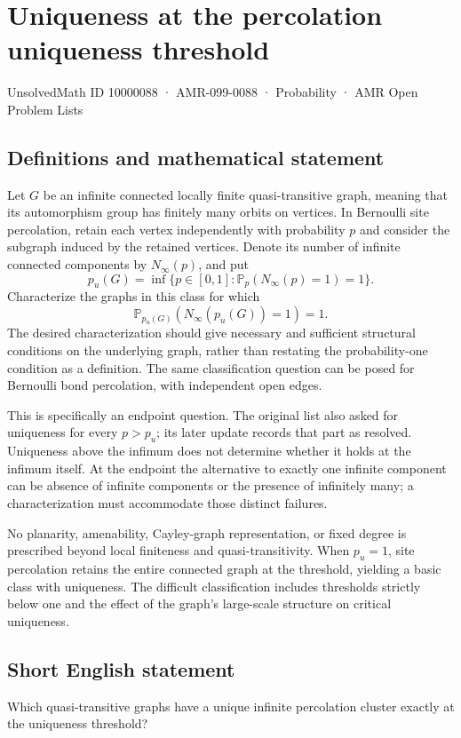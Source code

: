 \documentclass[11pt,a4paper]{article}
\begin{document}
\section*{Uniqueness at the percolation uniqueness threshold}\label{10000088}
{\small UnsolvedMath ID 10000088 · AMR-099-0088 · Probability · AMR Open Problem Lists}
\subsection{Definitions and mathematical statement}
Let $G$ be an infinite connected locally finite quasi-transitive graph, meaning that its automorphism group has finitely many orbits on vertices. In Bernoulli site percolation, retain each vertex independently with probability $p$ and consider the subgraph induced by the retained vertices. Denote its number of infinite connected components by $N_\infty(p)$, and put
\[
p_u(G)=\inf\{p\in[0,1]:\mathbb P_p(N_\infty(p)=1)=1\}.
\]
Characterize the graphs in this class for which
\[
\mathbb P_{p_u(G)}(N_\infty(p_u(G))=1)=1.
\]
The desired characterization should give necessary and sufficient structural conditions on the underlying graph, rather than restating the probability-one condition as a definition. The same classification question can be posed for Bernoulli bond percolation, with independent open edges.

This is specifically an endpoint question. The original list also asked for uniqueness for every $p>p_u$; its later update records that part as resolved. Uniqueness above the infimum does not determine whether it holds at the infimum itself. At the endpoint the alternative to exactly one infinite component can be absence of infinite components or the presence of infinitely many; a characterization must accommodate those distinct failures.

No planarity, amenability, Cayley-graph representation, or fixed degree is prescribed beyond local finiteness and quasi-transitivity. When $p_u=1$, site percolation retains the entire connected graph at the threshold, yielding a basic class with uniqueness. The difficult classification includes thresholds strictly below one and the effect of the graph's large-scale structure on critical uniqueness.
\subsection{Short English statement}
Which quasi-transitive graphs have a unique infinite percolation cluster exactly at the uniqueness threshold?
\end{document}
